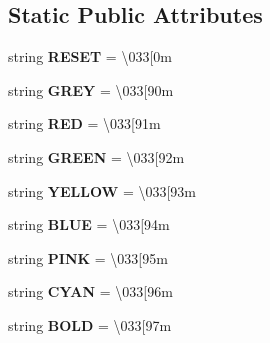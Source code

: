 \subsection*{Static Public Attributes}
\begin{DoxyCompactItemize}
\item 
string {\bfseries R\+E\+S\+ET} = \textquotesingle{}\textbackslash{}033\mbox{[}0m\textquotesingle{}\hypertarget{classTextColor_1_1TextColor_aa76ad5cdc7784e38f52304f68301d1ee}{}\label{classTextColor_1_1TextColor_aa76ad5cdc7784e38f52304f68301d1ee}

\item 
string {\bfseries G\+R\+EY} = \textquotesingle{}\textbackslash{}033\mbox{[}90m\textquotesingle{}\hypertarget{classTextColor_1_1TextColor_a565b59acdb552d8d4cf407808f4da426}{}\label{classTextColor_1_1TextColor_a565b59acdb552d8d4cf407808f4da426}

\item 
string {\bfseries R\+ED} = \textquotesingle{}\textbackslash{}033\mbox{[}91m\textquotesingle{}\hypertarget{classTextColor_1_1TextColor_a70bf90a0a5ed818d2b0a1f1e91b8da1c}{}\label{classTextColor_1_1TextColor_a70bf90a0a5ed818d2b0a1f1e91b8da1c}

\item 
string {\bfseries G\+R\+E\+EN} = \textquotesingle{}\textbackslash{}033\mbox{[}92m\textquotesingle{}\hypertarget{classTextColor_1_1TextColor_a770d720e1f72e4c766e77f6c707116cc}{}\label{classTextColor_1_1TextColor_a770d720e1f72e4c766e77f6c707116cc}

\item 
string {\bfseries Y\+E\+L\+L\+OW} = \textquotesingle{}\textbackslash{}033\mbox{[}93m\textquotesingle{}\hypertarget{classTextColor_1_1TextColor_afd5bbb030239d32247b42b2e87cc79a7}{}\label{classTextColor_1_1TextColor_afd5bbb030239d32247b42b2e87cc79a7}

\item 
string {\bfseries B\+L\+UE} = \textquotesingle{}\textbackslash{}033\mbox{[}94m\textquotesingle{}\hypertarget{classTextColor_1_1TextColor_a3e7836c782ed5065521efd1f20cb08ee}{}\label{classTextColor_1_1TextColor_a3e7836c782ed5065521efd1f20cb08ee}

\item 
string {\bfseries P\+I\+NK} = \textquotesingle{}\textbackslash{}033\mbox{[}95m\textquotesingle{}\hypertarget{classTextColor_1_1TextColor_aae18582e8d186c43d575365ca1759dfb}{}\label{classTextColor_1_1TextColor_aae18582e8d186c43d575365ca1759dfb}

\item 
string {\bfseries C\+Y\+AN} = \textquotesingle{}\textbackslash{}033\mbox{[}96m\textquotesingle{}\hypertarget{classTextColor_1_1TextColor_a6483b3ec9c8e5c463ebf2ebf2d2bc54e}{}\label{classTextColor_1_1TextColor_a6483b3ec9c8e5c463ebf2ebf2d2bc54e}

\item 
string {\bfseries B\+O\+LD} = \textquotesingle{}\textbackslash{}033\mbox{[}97m\textquotesingle{}\hypertarget{classTextColor_1_1TextColor_aee4bfb530a40209ae6d20da6ae022be6}{}\label{classTextColor_1_1TextColor_aee4bfb530a40209ae6d20da6ae022be6}

\end{DoxyCompactItemize}


